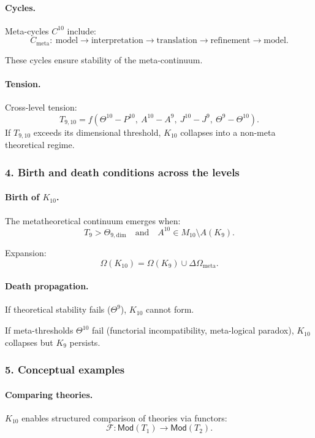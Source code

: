 \paragraph{Cycles.}
Meta-cycles $C^{10}$ include:
\[
C_{\mathrm{meta}}:\ 
\text{model} \rightarrow \text{interpretation} \rightarrow \text{translation}
\rightarrow \text{refinement} \rightarrow \text{model}.
\]

These cycles ensure stability of the meta-continuum.

\paragraph{Tension.}
Cross-level tension:
\[
T_{9,10} = 
f(\Theta^{10} - P^{10},\ A^{10} - A^9,\ 
  J^{10} - J^9,\ \Theta^9 - \Theta^{10}).
\]
If $T_{9,10}$ exceeds its dimensional threshold, $K_{10}$ collapses into a
non-meta theoretical regime.

\subsubsection{4. Birth and death conditions across the levels}

\paragraph{Birth of $K_{10}$.}
The metatheoretical continuum emerges when:
\[
T_9 > \Theta_{9,\mathrm{dim}}
\quad\text{and}\quad
A^{10} \in M_{10} \setminus A(K_9).
\]

Expansion:
\[
\Omega(K_{10}) = \Omega(K_9) \cup \Delta\Omega_{\mathrm{meta}}.
\]

\paragraph{Death propagation.}
If theoretical stability fails ($\Theta^9$), $K_{10}$ cannot form.

If meta-thresholds $\Theta^{10}$ fail (functorial incompatibility,
meta-logical paradox), $K_{10}$ collapses but $K_9$ persists.

\subsubsection{5. Conceptual examples}

\paragraph{Comparing theories.}
$K_{10}$ enables structured comparison of theories via functors:
\[
\mathcal{F} : \mathsf{Mod}(T_1) \rightarrow \mathsf{Mod}(T_2).
\]

